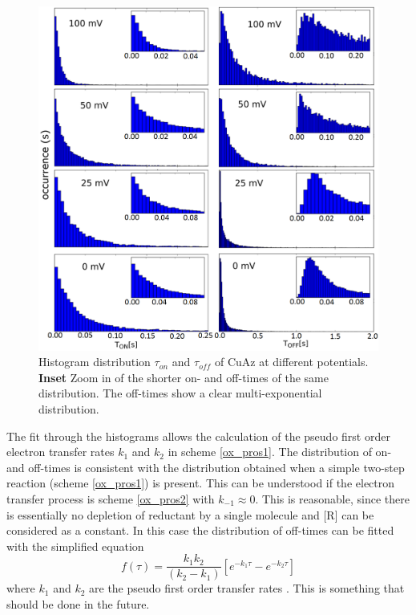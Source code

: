 \documentclass[twoside,single]{lion-msc}
\begin{document}
\begin{figure}[ht!]
\centering
\includegraphics[width=\textwidth]{Figure_4_4_histogram_thesis_test}
\caption{Histogram distribution $\tau_{on}$ and $\tau_{off}$ of CuAz at different potentials. \textbf{Inset} Zoom in of the shorter on- and off-times of the same distribution. The off-times show a clear multi-exponential distribution.}
\label{histograms_disc}
\end{figure}

The fit through the histograms allows the calculation of the pseudo first order electron transfer rates $k_{1}$ and $k_{2}$ in scheme \ref{ox_pros1}. The distribution of on- and off-times is consistent with the distribution obtained when a simple two-step reaction (scheme \ref{ox_pros1}) is present. This can be understood if the electron transfer process is scheme \ref{ox_pros2} with $k_{-1}\approx 0$. This is reasonable, since there is essentially no depletion of reductant by a single molecule and [R] can be considered as a constant. In this case the distribution of off-times can be fitted with the simplified equation
\begin{equation}\label{ox_pros3}
f(\tau) = \frac{k_{1}k_{2}}{(k_{2}-k_{1})}\left [e^{-k_{1}\tau}-e^{-k_{2}\tau} \right ]
\end{equation}
where $k_{1}$ and $k_{2}$ are the pseudo first order transfer rates \cite{Smiley2006}\cite{Xie}. This is something that should be done in the future.
\end{document}
